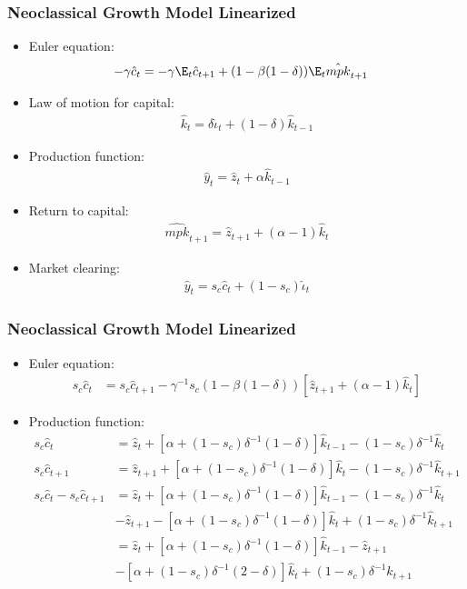 \documentclass[english,xcolor=svgnames]{beamer}
\begin{document}
 \begin{frame}
	\frametitle{Neoclassical Growth Model Linearized}
	\begin{itemize}
		\item Euler equation:
		\begin{align*}
			-\gamma \hat{c}_t &= -\gamma \E_t \hat{c}_{t+1} + (1 - \beta(1-\delta)) \E_t \hat{mpk}_{t+1}
		\end{align*}
		\item Law of motion for capital:
		\begin{align*}
			\hat{k}_{t} =\delta \hat{\iota}_{t} + (1-\delta)\hat{k}_{t-1}
		\end{align*}
		\item Production function:
		\begin{align*}
			\hat{y}_t = \hat{z}_t + \alpha \hat{k}_{t-1}
		\end{align*}
		\item Return to capital:
		\begin{align*}
			\hat{mpk}_{t+1} =  \hat{z}_{t+1} + (\alpha-1) \hat{k}_t 
		\end{align*}
		\item Market clearing:
		\begin{align*}
			\hat{y}_t = s_c \hat{c}_t +(1-s_c) \hat{\iota}_t
		\end{align*}
	 \end{itemize}
 \end{frame}
 
  \begin{frame}
	\frametitle{Neoclassical Growth Model Linearized}
	\begin{itemize}
		\item Euler equation:
		\begin{align*}
			 s_c\hat{c}_t &=  s_c \hat{c}_{t+1} -\gamma^{-1} s_c(1 - \beta(1-\delta)) [\hat{z}_{t+1} + (\alpha-1) \hat{k}_t]
		\end{align*}
		\item Production function:
		\begin{align*}
			s_c \hat{c}_t   &= \hat{z}_t + [\alpha + (1-s_c)\delta^{-1}(1-\delta)] \hat{k}_{t-1} - (1-s_c)\delta^{-1}\hat{k}_{t} \\
			s_c \hat{c}_{t+1}   &= \hat{z}_{t+1} + [\alpha + (1-s_c)\delta^{-1}(1-\delta)] \hat{k}_{t} - (1-s_c)\delta^{-1}\hat{k}_{t+1} \\
			s_c \hat{c}_t - s_c \hat{c}_{t+1} &= \hat{z}_t + [\alpha + (1-s_c)\delta^{-1}(1-\delta)] \hat{k}_{t-1} - (1-s_c)\delta^{-1}\hat{k}_{t} \\
			& -\hat{z}_{t+1} - [\alpha + (1-s_c)\delta^{-1}(1-\delta)] \hat{k}_{t} + (1-s_c)\delta^{-1}\hat{k}_{t+1} \\
			&= \hat{z}_t + [\alpha + (1-s_c)\delta^{-1}(1-\delta)] \hat{k}_{t-1} -\hat{z}_{t+1}  \\
			&  - [\alpha + (1-s_c)\delta^{-1}(2-\delta)] \hat{k}_{t} + (1-s_c)\delta^{-1}\hat{k}_{t+1} \\
		\end{align*}
	 \end{itemize}
 \end{frame}
 
\end{document}
